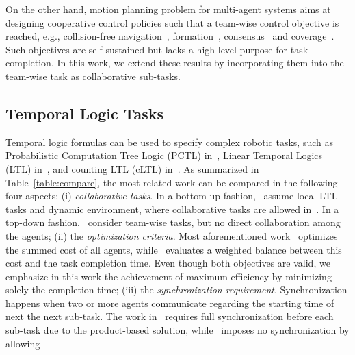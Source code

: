 On the other hand,
motion planning problem for multi-agent systems aims at designing cooperative control policies such that a team-wise control objective is reached,
e.g., collision-free navigation~\cite{lavalle2006planning}, formation~\cite{chen2005formation},
consensus~\cite{li2009consensus} and coverage~\cite{mesbahi2010graph}.
Such objectives are self-sustained but lacks a high-level purpose for task completion.
In this work, we extend these results by incorporating them into the team-wise task as collaborative sub-tasks.


\subsection{Temporal Logic Tasks}\label{subsec:multi-ltl}

Temporal logic formulas can be used to specify complex robotic tasks,
such as Probabilistic Computation Tree Logic (PCTL) in~\cite{lahijanian2011temporal},
Linear Temporal Logics (LTL) in~\cite{kantaros2020stylus, schillinger2018simultaneous,
 guo2015multi, chen2011formal},
and counting LTL (cLTL) in~\cite{sahin2019multirobot}.
As summarized in Table~\ref{table:compare},
the most related work can be compared in the following four aspects:
(i) \emph{collaborative tasks}.
In a bottom-up fashion,~\cite{guo2015multi, tumova2016multi, guo2016task} assume local LTL tasks and dynamic environment,
where collaborative tasks are allowed in~\cite{guo2016task}.
In a top-down fashion,~\cite{kantaros2020stylus, schillinger2018simultaneous, luo2021temporal, sahin2019multirobot, jones2019scratchs} consider team-wise tasks,
but no direct collaboration among the agents;
(ii) the \emph{optimization criteria}.
Most aforementioned work~\cite{kantaros2020stylus, guo2016task, luo2021temporal, sahin2019multirobot, jones2019scratchs} optimizes
the summed cost of all agents,
while~\cite{schillinger2018simultaneous} evaluates a weighted balance between this cost and
the task completion time.
Even though both objectives are valid,
we emphasize in this work the achievement of maximum efficiency by minimizing solely the completion time;
(iii) the \emph{synchronization requirement}.
Synchronization happens when two or more agents communicate regarding the starting time of next the next sub-task.
The work in~\cite{kantaros2020stylus, luo2021abstraction, sahin2019multirobot} requires
full synchronization before each sub-task due to the product-based solution,
while~\cite{schillinger2018simultaneous} imposes no synchronization by allowing
